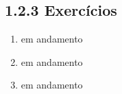 \subsection{1.2.3 Exerc\'icios}

	\begin{enumerate}
		\item em andamento
		\item em andamento
		\item em andamento
	\end{enumerate}

